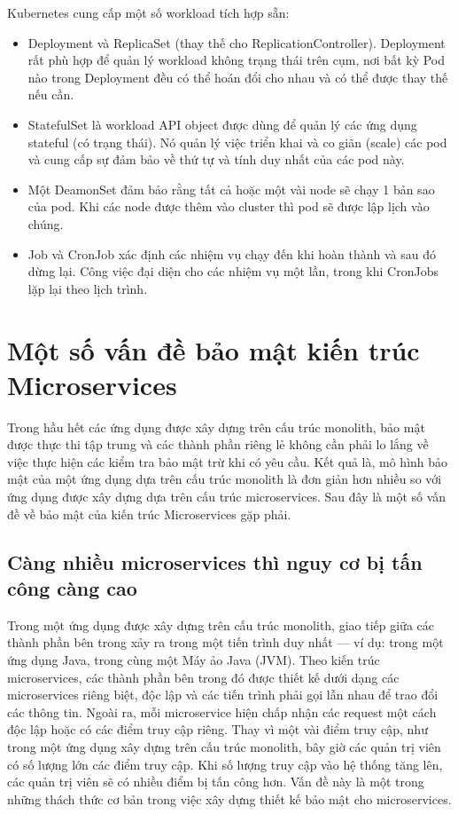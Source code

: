 \documentclass[12pt,a4paper]{report}
\begin{document}
				Kubernetes cung cấp một số workload tích hợp sẵn:
				\begin{itemize}				
					\item Deployment và ReplicaSet (thay thế cho ReplicationController). Deployment rất phù hợp để quản lý workload không trạng thái trên cụm, nơi bất kỳ Pod nào trong Deployment đều có thể hoán đổi cho nhau và có thể được thay thế nếu cần.
					\item StatefulSet là workload API object được dùng để quản lý các ứng dụng stateful (có trạng thái). Nó quản lý việc triển khai và co giãn (scale) các pod và cung cấp sự đảm bảo về thứ tự và tính duy nhất của các pod này.
					\item  Một DeamonSet đảm bảo rằng tất cả hoặc một vài node sẽ chạy 1 bản sao của pod. Khi các node được thêm vào cluster thì pod sẽ được lập lịch vào chúng.
					\item  Job và CronJob xác định các nhiệm vụ chạy đến khi hoàn thành và sau đó dừng lại. Công việc đại diện cho các nhiệm vụ một lần, trong khi CronJobs lặp lại theo lịch trình.
				\end{itemize}
	\section{Một số vấn đề bảo mật kiến trúc Microservices}
			{\hspace{0.6cm}Trong hầu hết các ứng dụng được xây dựng trên cấu trúc monolith, bảo mật được thực thi tập trung và các thành phần riêng lẻ không cần phải lo lắng về việc thực hiện các kiểm tra bảo mật trừ khi có yêu cầu. Kết quả là, mô hình bảo mật của một ứng dụng dựa trên cấu trúc monolith là đơn giản hơn nhiều so với ứng dụng được xây dựng dựa trên cấu trúc microservices. Sau đây là một số vấn đề về bảo mật của kiến trúc Microservices gặp phải.\\}			
		\subsection{Càng nhiều microservices thì nguy cơ bị tấn công càng cao}
				{\hspace{0.6cm}Trong một ứng dụng được xây dựng trên cấu trúc monolith, giao tiếp giữa các thành phần bên trong xảy ra trong một tiến trình duy nhất — ví dụ: trong một ứng dụng Java, trong cùng một Máy ảo Java (JVM). Theo kiến trúc microservices, các thành phần bên trong đó được thiết kế dưới dạng các microservices riêng biệt, độc lập và các tiến trình phải gọi lẫn nhau để trao đổi các thông tin. Ngoài ra, mỗi microservice hiện chấp nhận các request một cách độc lập hoặc có các điểm truy cập riêng. Thay vì một vài điểm truy cập, như trong một ứng dụng xây dựng trên cấu trúc monolith, bây giờ các quản trị viên có số lượng lớn các điểm truy cập. Khi số lượng truy cập vào hệ thống tăng lên, các quản trị viên sẽ có nhiều điểm bị tấn công hơn. Vấn đề này là một trong những thách thức cơ bản trong việc xây dựng thiết kế bảo mật cho microservices.\\}
\end{document}
